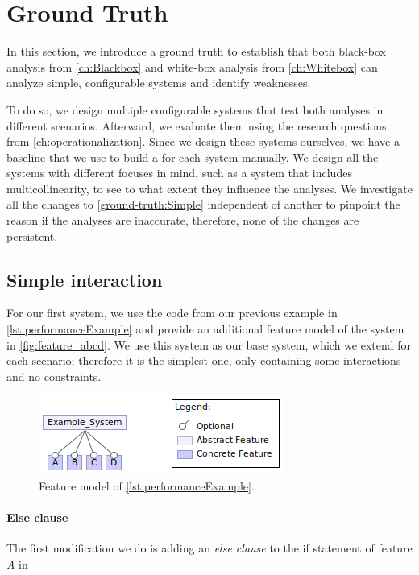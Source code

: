 \section{Ground Truth}\label{sec:ground-truth}
In this section, we introduce a ground truth to establish that both black-box analysis from \autoref{ch:Blackbox} 
and white-box analysis from \autoref{ch:Whitebox} can analyze simple, configurable systems and identify weaknesses. 

To do so, we design multiple configurable systems that test both analyses in different scenarios. 
Afterward, we evaluate them using the research questions from \autoref{ch:operationalization}. 
Since we design these systems ourselves, we have a baseline that we use to build a \perfInfluenceModel for each system manually. 
We design all the systems with different focuses in mind, such as a system that includes multicollinearity, 
to see to what extent they influence the analyses. 
We investigate all the changes to \autoref{ground-truth:Simple} independent of another to pinpoint the reason if the analyses
are inaccurate, therefore, none of the changes are persistent.


\subsection{Simple interaction}\label{ground-truth:Simple}
For our first system, we use the code from our previous example in \autoref{lst:performanceExample} and provide an additional feature model 
of the system in \autoref{fig:feature_abcd}. 
We use this system as our base system, which we extend for each scenario; therefore it is the simplest one, 
only containing some interactions and no constraints.

\begin{figure}[h]
    \centering
    \includegraphics[scale=0.55]{gfx/Feature_ABCD.png}
    \caption{Feature model of \autoref{lst:performanceExample}.}
    \label{fig:feature_abcd}
\end{figure}


\paragraph{Else clause}
The first modification we do is adding an \emph{else clause} to the if statement of feature \emph{A} in 

